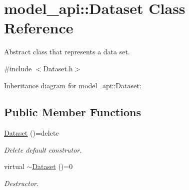 \hypertarget{classmodel__api_1_1Dataset}{}\section{model\+\_\+api\+:\+:Dataset Class Reference}
\label{classmodel__api_1_1Dataset}


Abstract class that represents a data set.  




{\ttfamily \#include $<$Dataset.\+h$>$}



Inheritance diagram for model\+\_\+api\+:\+:Dataset\+:
\subsection*{Public Member Functions}
\begin{DoxyCompactItemize}
\item 
\mbox{\label{classmodel__api_1_1Dataset_af3bb5174dc26a002453038644d0d92c8}} 
\hyperlink{classmodel__api_1_1Dataset_af3bb5174dc26a002453038644d0d92c8}{Dataset} ()=delete
\begin{DoxyCompactList}\small\item\em Delete default construtor. \end{DoxyCompactList}\item 
\mbox{\label{classmodel__api_1_1Dataset_a447ae945efa7d7d2588aa5b482bb565c}} 
virtual \hyperlink{classmodel__api_1_1Dataset_a447ae945efa7d7d2588aa5b482bb565c}{$\sim$\+Dataset} ()=0
\begin{DoxyCompactList}\small\item\em Destructor. \end{DoxyCompactList}\end{DoxyCompactItemize}
